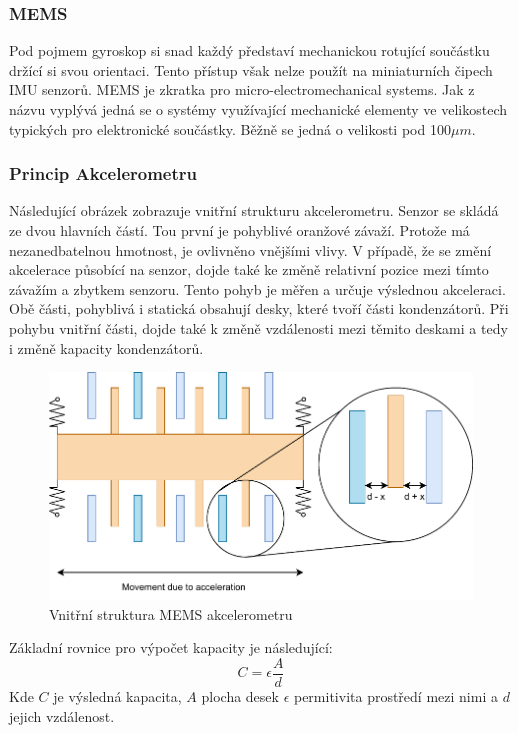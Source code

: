 \subsubsection*{MEMS}

Pod pojmem gyroskop si snad každý představí mechanickou rotující součástku držící si svou orientaci. Tento přístup však nelze použít na miniaturních čipech IMU senzorů. MEMS je zkratka pro micro-electromechanical systems. Jak z názvu vyplývá jedná se o systémy využívající mechanické elementy ve velikostech typických pro elektronické součástky. Běžně se jedná o velikosti pod 100$\mu m$.

\subsubsection*{Princip Akcelerometru}
Následující obrázek zobrazuje vnitřní strukturu akcelerometru. Senzor se skládá ze dvou hlavních částí. Tou první je pohyblivé oranžové závaží. Protože má nezanedbatelnou hmotnost, je ovlivněno vnějšími vlivy. V případě, že se změní akcelerace působící na senzor, dojde také ke změně relativní pozice mezi tímto závažím a zbytkem senzoru. Tento pohyb je měřen a určuje výslednou akceleraci. Obě části, pohyblivá i statická obsahují desky, které tvoří části kondenzátorů. Při pohybu vnitřní části, dojde také k změně vzdálenosti mezi těmito deskami a tedy i změně kapacity kondenzátorů. \cite{mems}

\begin{figure}[h!]
	\centering
	\includegraphics[scale=0.8]{obrazky-figures/accelerometer.pdf}
	\caption{Vnitřní struktura MEMS akcelerometru}
	\label{}
\end{figure}

Základní rovnice pro výpočet kapacity je následující:
$$C = \epsilon \frac{A}{d}$$
Kde $C$ je výsledná kapacita, $A$ plocha desek $\epsilon$ permitivita prostředí mezi nimi a $d$ jejich vzdálenost.

